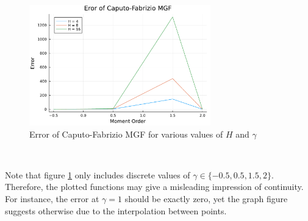 \begin{figure}[H]
    \centering
    \includegraphics[width=0.7\textwidth]{figures/conditional_moments_error.pdf}
    \caption{Error of Caputo-Fabrizio MGF for various values of \(H\) and \(\gamma\)}
    \label{fig:conditional_moments_error}
\end{figure}\

Note that figure \ref{fig:conditional_moments_error} only includes discrete values of \(\gamma \in \{-0.5, 0.5, 1.5, 2\}\). Therefore, the plotted functions may give a misleading impression of continuity. For instance, the error at \(\gamma = 1\) should be exactly zero, yet the graph figure suggests otherwise due to the interpolation between points.

